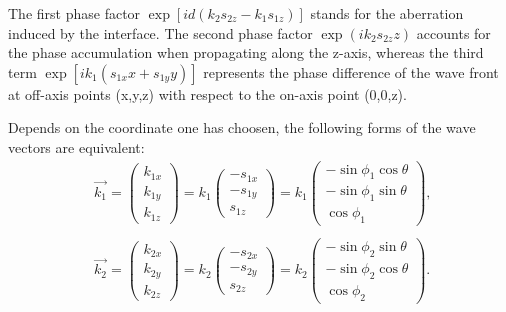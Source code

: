 \documentclass[9pt,twocolumn,twoside]{osajnl}
\begin{document}
The first phase factor $\exp[id(k_2s_{2z}-k_1s_{1z})]$ stands for the aberration induced by the interface. The second phase factor $\exp(ik_2s_{2z}z)$ accounts for the phase accumulation when propagating along the z-axis, whereas the third term $\exp[ik_1(s_{1x}x+s_{1y}y)]$ represents the phase difference of the wave front at off-axis points (x,y,z) with respect to the on-axis point (0,0,z).

Depends on the coordinate one has choosen, the following forms of the wave vectors are equivalent:
\begin{equation}\label{eq:13}
	\begin{aligned}
		&\vec{k_1}=\begin{pmatrix}
			k_{1x}\\
			k_{1y}\\
			k_{1z}
		\end{pmatrix}=k_1	
		\begin{pmatrix}
			-s_{1x}\\
			-s_{1y}\\
			s_{1z}	
		\end{pmatrix}=k_1
		\begin{pmatrix}
			-\sin\phi_1\cos\theta\\
			-\sin\phi_1\sin\theta\\
			\cos\phi_1	
		\end{pmatrix},\,\,\\\\
	&\vec{k_2}=\begin{pmatrix}
		k_{2x}\\
		k_{2y}\\
		k_{2z}
	\end{pmatrix}=k_2	
		\begin{pmatrix}
			-s_{2x}\\
			-s_{2y}\\
			s_{2z}	
		\end{pmatrix}=k_2
		\begin{pmatrix}
			-\sin\phi_2\sin\theta\\
			-\sin\phi_2\cos\theta\\
			\cos\phi_2	
		\end{pmatrix}.		
	\end{aligned}
\end{equation}
\end{document}
